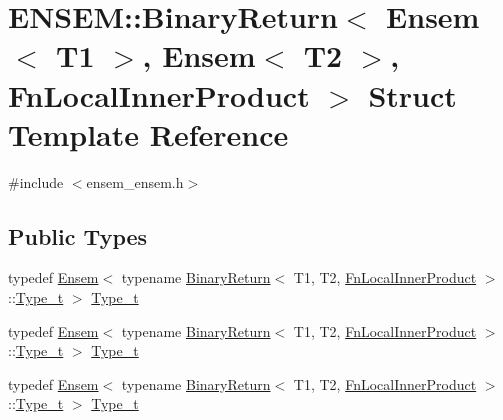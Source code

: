 \hypertarget{structENSEM_1_1BinaryReturn_3_01Ensem_3_01T1_01_4_00_01Ensem_3_01T2_01_4_00_01FnLocalInnerProduct_01_4}{}\section{E\+N\+S\+EM\+:\+:Binary\+Return$<$ Ensem$<$ T1 $>$, Ensem$<$ T2 $>$, Fn\+Local\+Inner\+Product $>$ Struct Template Reference}
\label{structENSEM_1_1BinaryReturn_3_01Ensem_3_01T1_01_4_00_01Ensem_3_01T2_01_4_00_01FnLocalInnerProduct_01_4}


{\ttfamily \#include $<$ensem\+\_\+ensem.\+h$>$}

\subsection*{Public Types}
\begin{DoxyCompactItemize}
\item 
typedef \mbox{\hyperlink{classENSEM_1_1Ensem}{Ensem}}$<$ typename \mbox{\hyperlink{structENSEM_1_1BinaryReturn}{Binary\+Return}}$<$ T1, T2, \mbox{\hyperlink{structENSEM_1_1FnLocalInnerProduct}{Fn\+Local\+Inner\+Product}} $>$\+::\mbox{\hyperlink{structENSEM_1_1BinaryReturn_3_01Ensem_3_01T1_01_4_00_01Ensem_3_01T2_01_4_00_01FnLocalInnerProduct_01_4_acc62c13dfe7fd3c6776412ba9f1c3a3f}{Type\+\_\+t}} $>$ \mbox{\hyperlink{structENSEM_1_1BinaryReturn_3_01Ensem_3_01T1_01_4_00_01Ensem_3_01T2_01_4_00_01FnLocalInnerProduct_01_4_acc62c13dfe7fd3c6776412ba9f1c3a3f}{Type\+\_\+t}}
\item 
typedef \mbox{\hyperlink{classENSEM_1_1Ensem}{Ensem}}$<$ typename \mbox{\hyperlink{structENSEM_1_1BinaryReturn}{Binary\+Return}}$<$ T1, T2, \mbox{\hyperlink{structENSEM_1_1FnLocalInnerProduct}{Fn\+Local\+Inner\+Product}} $>$\+::\mbox{\hyperlink{structENSEM_1_1BinaryReturn_3_01Ensem_3_01T1_01_4_00_01Ensem_3_01T2_01_4_00_01FnLocalInnerProduct_01_4_acc62c13dfe7fd3c6776412ba9f1c3a3f}{Type\+\_\+t}} $>$ \mbox{\hyperlink{structENSEM_1_1BinaryReturn_3_01Ensem_3_01T1_01_4_00_01Ensem_3_01T2_01_4_00_01FnLocalInnerProduct_01_4_acc62c13dfe7fd3c6776412ba9f1c3a3f}{Type\+\_\+t}}
\item 
typedef \mbox{\hyperlink{classENSEM_1_1Ensem}{Ensem}}$<$ typename \mbox{\hyperlink{structENSEM_1_1BinaryReturn}{Binary\+Return}}$<$ T1, T2, \mbox{\hyperlink{structENSEM_1_1FnLocalInnerProduct}{Fn\+Local\+Inner\+Product}} $>$\+::\mbox{\hyperlink{structENSEM_1_1BinaryReturn_3_01Ensem_3_01T1_01_4_00_01Ensem_3_01T2_01_4_00_01FnLocalInnerProduct_01_4_acc62c13dfe7fd3c6776412ba9f1c3a3f}{Type\+\_\+t}} $>$ \mbox{\hyperlink{structENSEM_1_1BinaryReturn_3_01Ensem_3_01T1_01_4_00_01Ensem_3_01T2_01_4_00_01FnLocalInnerProduct_01_4_acc62c13dfe7fd3c6776412ba9f1c3a3f}{Type\+\_\+t}}
\end{DoxyCompactItemize}


